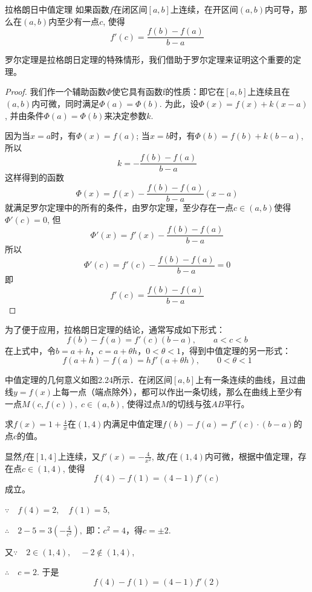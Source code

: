 \begin{blk}
    {拉格朗日中值定理} 如果函数$f$在闭区间$[a,b]$上连续，在开区间$(a,b)$内可导，那么在$(a,b)$内至少有一点$c$, 使得
\[f'(c)=\frac{f(b)-f(a)}{b-a}\]
\end{blk}

罗尔定理是拉格朗日定理的特殊情形，我们借助于罗尔定理来证明这个重要的定理。

\begin{proof}
 我们作一个辅助函数$\Phi$使它具有函数f的性质：即它在$[a,b]$上连续且在$(a,b)$内可微，同时满足$\Phi (a)=\Phi (b)$. 为此，设$\Phi  (x) =f (x) +k (x-a)$, 并由条件$\Phi (a)=\Phi (b)$来决定参数$k$. 

因为当$x=a$时，有$\Phi (x)=f(a)$; 当$x=b$时，有$\Phi (b)=f(b)+k(b-a)$, 所以
\[k=-\frac{f (b) -f (a)}{b-a}\]
这样得到的函数
\[\Phi  (x) =f (x) -\frac{f (b) -f (a) }{b-a}(x-a)\]
就满足罗尔定理中的所有的条件，由罗尔定理，至少存在一点$c\in (a,b)$使得$\Phi '(c)=0$,
但
\[\Phi ' (x) =f' (x) -\frac{f (b) -f (a)}{b-a}\]
所以
\[\Phi ' (c) =f' (c) -\frac{f (b) -f (a)}{b-a} =0\]
即
\[f' (c) =\frac{f (b) -f (a)}{b-a}\]
\end{proof}

为了便于应用，拉格朗日定理的结论，通常写成如下形式：
\begin{equation}
   f (b) -f (a) =f' (c) (b-a),\qquad a<c<b 
\end{equation}
在上式中，令$b=a+h$，$c=a+\theta h$，$0<\theta<1$，得到中值定理的另一形式：
\begin{equation}
    f (a+h) -f (a) =hf' (a+\theta h) ,\qquad 0<\theta<1
\end{equation}

中值定理的几何意义如图2.24所示．在闭区间$[a,b]$上有一条连续的曲线，且过曲线$y=f(x)$上每一点（端点除外），都可以作出一条切线，那么在曲线上至少有一点$M(c, f( c)),\; c\in (a,b)$, 使得过点$M$的切线与弦$AB$平行。

\begin{figure}[htp]
    \centering
\begin{tikzpicture}

\end{tikzpicture}
    \caption{}
\end{figure}



\begin{example}
求$f(x)=1+\frac{4}{x}$在$(1, 4)$内满足中值定理$f(b)-f(a)=f'(c)\cdot (b-a)$的点$c$的值。
\end{example}


\begin{solution}
    显然$f$在$[1, 4]$上连续，又$f'(x)=-\frac{4}{x^2}$, 故$f$在$(1, 4)$内可微，根据中值定理，存在点$c\in (1, 4)$, 使得
\[    f (4) -f (1) = (4-1) f' (c)\]
成立。

$\because\quad f (4) =2,\quad f (1) =5$,

$\therefore\quad 2-5=3 \left(-\frac{4}{c^2}\right),$
即：$c^2=4$，得$c=\pm 2$.

又$\because\quad 2\in (1, 4),\quad -2\notin (1, 4)$,

$\therefore\quad c=2$. 于是
\[    f (4) -f (1) = (4-1) f' (2) \]
\end{solution}

